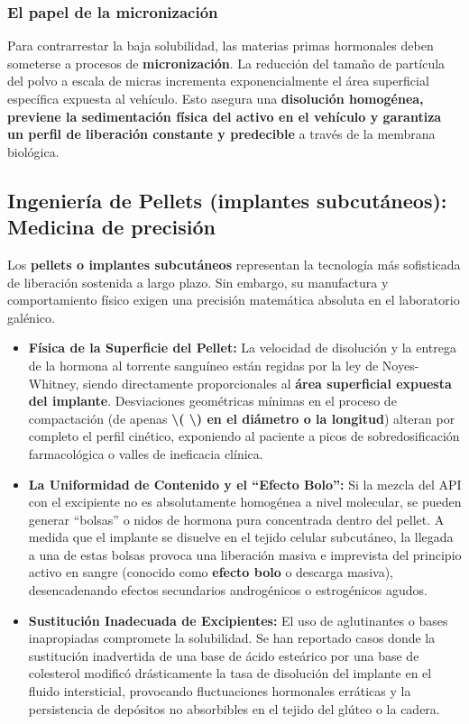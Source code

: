\documentclass[
  spanish,
]{article}
\begin{document}
\subsubsection{El papel de la micronización}\label{el-papel-de-la-micronizaciuxf3n}

Para contrarrestar la baja solubilidad, las materias primas hormonales deben someterse a procesos de \textbf{micronización}. La reducción del tamaño de partícula del polvo a escala de micras incrementa exponencialmente el área superficial específica expuesta al vehículo. Esto asegura una \textbf{disolución homogénea, previene la sedimentación física del activo en el vehículo y garantiza un perfil de liberación constante y predecible} a través de la membrana biológica.

\subsection{Ingeniería de Pellets (implantes subcutáneos): Medicina de precisión}\label{ingenieruxeda-de-pellets-implantes-subcutuxe1neos-medicina-de-precisiuxf3n}

Los \textbf{pellets o implantes subcutáneos} representan la tecnología más sofisticada de liberación sostenida a largo plazo. Sin embargo, su manufactura y comportamiento físico exigen una precisión matemática absoluta en el laboratorio galénico.

\begin{itemize}
\item
  \textbf{Física de la Superficie del Pellet:} La velocidad de disolución y la entrega de la hormona al torrente sanguíneo están regidas por la ley de Noyes-Whitney, siendo directamente proporcionales al \textbf{área superficial expuesta del implante}. Desviaciones geométricas mínimas en el proceso de compactación (de apenas \textbf{\textbackslash( \textbackslash) en el diámetro o la longitud}) alteran por completo el perfil cinético, exponiendo al paciente a picos de sobredosificación farmacológica o valles de ineficacia clínica.
\item
  \textbf{La Uniformidad de Contenido y el ``Efecto Bolo'':} Si la mezcla del API con el excipiente no es absolutamente homogénea a nivel molecular, se pueden generar ``bolsas'' o nidos de hormona pura concentrada dentro del pellet. A medida que el implante se disuelve en el tejido celular subcutáneo, la llegada a una de estas bolsas provoca una liberación masiva e imprevista del principio activo en sangre (conocido como \textbf{efecto bolo} o descarga masiva), desencadenando efectos secundarios androgénicos o estrogénicos agudos.
\item
  \textbf{Sustitución Inadecuada de Excipientes:} El uso de aglutinantes o bases inapropiadas compromete la solubilidad. Se han reportado casos donde la sustitución inadvertida de una base de ácido esteárico por una base de colesterol modificó drásticamente la tasa de disolución del implante en el fluido intersticial, provocando fluctuaciones hormonales erráticas y la persistencia de depósitos no absorbibles en el tejido del glúteo o la cadera.
\end{itemize}
\end{document}
